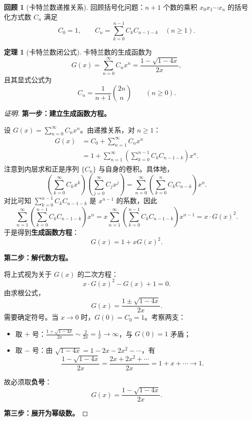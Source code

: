 \documentclass[UTF8,11pt,a4paper]{ctexbook}   %
\theoremstyle{definition}
\newtheorem{theorem}{定理}[section]
\newtheorem{recall}{回顾}[section]
\begin{document}
\begin{recall}[卡特兰数递推关系]
回顾括号化问题：$n+1$ 个数的乘积 $x_0x_1\cdots x_n$ 的括号化方式数 $C_n$ 满足
\[
C_0=1,\qquad C_n=\sum_{k=0}^{n-1}C_k C_{n-1-k}\quad(n\ge 1).
\]
\end{recall}

\begin{theorem}[卡特兰数闭公式]
卡特兰数的生成函数为
\[
G(x)=\sum_{n=0}^{\infty}C_n x^n=\frac{1-\sqrt{1-4x}}{2x},
\]
且其显式公式为
\[
\boxed{C_n=\frac{1}{n+1}\binom{2n}{n}\qquad(n\ge 0).}
\]
\end{theorem}

\begin{proof}[证明]
\textbf{第一步：建立生成函数方程。}

设 $\displaystyle G(x)=\sum_{n=0}^{\infty}C_n x^n$。由递推关系，对 $n\ge 1$：
\begin{align*}
G(x) &= C_0 + \sum_{n=1}^{\infty}C_n x^n \\
&= 1 + \sum_{n=1}^{\infty}\left(\sum_{k=0}^{n-1}C_k C_{n-1-k}\right)x^n.
\end{align*}
注意到内层求和正是序列 $\{C_n\}$ 与自身的卷积。具体地，
\[
\left(\sum_{k=0}^{\infty}C_k x^k\right)\left(\sum_{j=0}^{\infty}C_j x^j\right)
=\sum_{n=0}^{\infty}\left(\sum_{k=0}^{n}C_k C_{n-k}\right)x^n.
\]
对比可知 $\sum_{k=0}^{n-1}C_k C_{n-1-k}$ 是 $x^{n-1}$ 的系数，因此
\[
\sum_{n=1}^{\infty}\left(\sum_{k=0}^{n-1}C_k C_{n-1-k}\right)x^n
= x\sum_{n=1}^{\infty}\left(\sum_{k=0}^{n-1}C_k C_{n-1-k}\right)x^{n-1}
= x\cdot G(x)^2.
\]
于是得到\textbf{生成函数方程}：
\[
\boxed{G(x)=1+xG(x)^2.}
\]

\textbf{第二步：解代数方程。}

将上式视为关于 $G(x)$ 的二次方程：
\[
x\cdot G(x)^2 - G(x) + 1 = 0.
\]
由求根公式，
\[
G(x)=\frac{1\pm\sqrt{1-4x}}{2x}.
\]
需要确定符号。当 $x\to 0$ 时，$G(0)=C_0=1$。考察两支：
\begin{itemize}
    \item 取 $+$ 号：$\displaystyle\frac{1+\sqrt{1-4x}}{2x}\sim\frac{2}{2x}=\frac{1}{x}\to\infty$，与 $G(0)=1$ 矛盾；
    \item 取 $-$ 号：由 $\sqrt{1-4x}=1-2x-2x^2-\cdots$，有
    \[
    \frac{1-\sqrt{1-4x}}{2x}=\frac{2x+2x^2+\cdots}{2x}=1+x+\cdots\to 1.
    \]
\end{itemize}
故必须取\textbf{负号}：
\[
G(x)=\frac{1-\sqrt{1-4x}}{2x}.
\]

\textbf{第三步：展开为幂级数。}


\end{proof}
\end{document}
